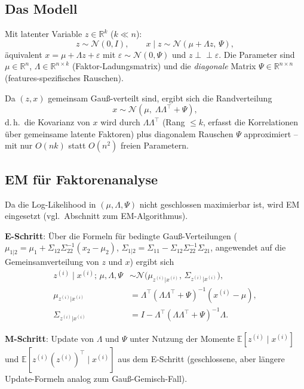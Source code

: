 \documentclass[11pt]{article}
\theoremstyle{csthm}
\theoremstyle{csdef}
\newcommand{\R}{\mathbb{R}}
\newcommand{\E}{\mathbb{E}}
\newcommand{\N}{\mathcal{N}}
\newcommand{\T}{^\top}
\newcommand{\indep}{\perp\!\!\!\perp}
\begin{document}
\subsection{Das Modell}

Mit latenter Variable $z \in \R^k$ ($k \ll n$):
\begin{equation}
  z \sim \N(0, I), \qquad x \mid z \sim \N(\mu + \Lambda z,\, \Psi),
\end{equation}
äquivalent $x = \mu + \Lambda z + \varepsilon$ mit $\varepsilon\sim\N(0,\Psi)$
und $z \indep \varepsilon$. Die Parameter sind $\mu\in\R^n$,
$\Lambda\in\R^{n\times k}$ (Faktor-Ladungsmatrix) und die \emph{diagonale}
Matrix $\Psi\in\R^{n\times n}$ (features-spezifisches Rauschen).

Da $(z,x)$ gemeinsam Gauß-verteilt sind, ergibt sich die Randverteilung
\begin{equation}
  x \sim \N(\mu,\; \Lambda\Lambda\T + \Psi),
\end{equation}
d.\,h.\ die Kovarianz von $x$ wird durch $\Lambda\Lambda\T$ (Rang $\leq k$,
erfasst die Korrelationen über gemeinsame latente Faktoren) plus diagonalem
Rauschen $\Psi$ approximiert -- mit nur $O(nk)$ statt $O(n^2)$ freien
Parametern.

\subsection{EM für Faktorenanalyse}

Da die Log-Likelihood in $(\mu,\Lambda,\Psi)$ nicht geschlossen maximierbar
ist, wird EM eingesetzt (vgl.\ Abschnitt zum EM-Algorithmus).

\textbf{E-Schritt}: Über die Formeln für bedingte Gauß-Verteilungen
($\mu_{1|2} = \mu_1+\Sigma_{12}\Sigma_{22}^{-1}(x_2-\mu_2)$,
$\Sigma_{1|2}=\Sigma_{11}-\Sigma_{12}\Sigma_{22}^{-1}\Sigma_{21}$, angewendet
auf die Gemeinsamverteilung von $z$ und $x$) ergibt sich
\begin{align}
  z^{(i)} \mid x^{(i)};\,\mu,\Lambda,\Psi &\sim \N\bigl(\mu_{z^{(i)}|x^{(i)}},\, \Sigma_{z^{(i)}|x^{(i)}}\bigr), \\
  \mu_{z^{(i)}|x^{(i)}} &= \Lambda\T(\Lambda\Lambda\T+\Psi)^{-1}(x^{(i)}-\mu), \\
  \Sigma_{z^{(i)}|x^{(i)}} &= I - \Lambda\T(\Lambda\Lambda\T+\Psi)^{-1}\Lambda.
\end{align}

\textbf{M-Schritt}: Update von $\Lambda$ und $\Psi$ unter Nutzung der
Momente $\E[z^{(i)}\mid x^{(i)}]$ und $\E[z^{(i)}(z^{(i)})\T\mid x^{(i)}]$ aus
dem E-Schritt (geschlossene, aber längere Update-Formeln analog zum
Gauß-Gemisch-Fall).
\end{document}
